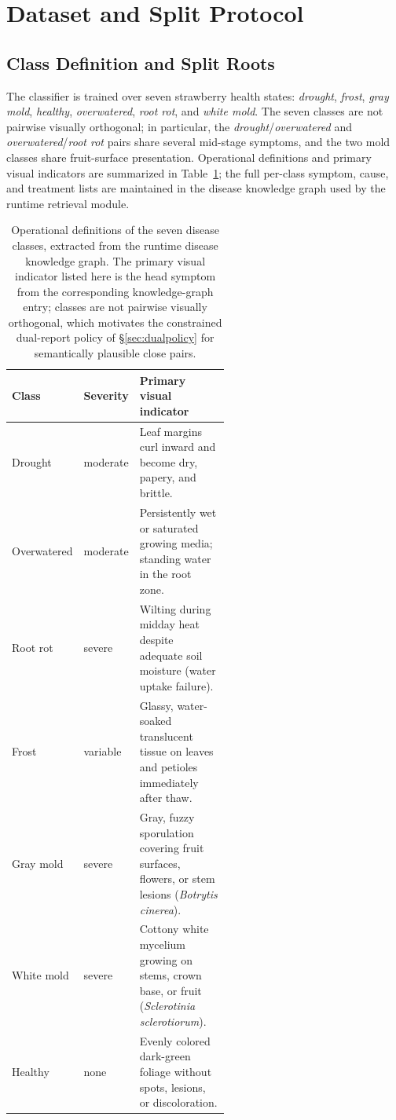 \section{Dataset and Split Protocol}
\label{sec:data}

\subsection{Class Definition and Split Roots}

The classifier is trained over seven strawberry health states:
\emph{drought}, \emph{frost}, \emph{gray mold}, \emph{healthy},
\emph{overwatered}, \emph{root rot}, and \emph{white mold}. The seven
classes are not pairwise visually orthogonal; in particular, the
\emph{drought}/\emph{overwatered} and \emph{overwatered}/\emph{root rot}
pairs share several mid-stage symptoms, and the two mold classes share
fruit-surface presentation. Operational definitions and primary
visual indicators are summarized in Table~\ref{tab:class-defs}; the
full per-class symptom, cause, and treatment lists are maintained in
the disease knowledge graph used by the runtime retrieval module.

\begin{table}[t]
\centering
\caption{Operational definitions of the seven disease classes,
extracted from the runtime disease knowledge graph. The primary visual
indicator listed here is the head symptom from the corresponding
knowledge-graph entry; classes are not pairwise visually orthogonal,
which motivates the constrained dual-report policy of
\S\ref{sec:dualpolicy} for semantically plausible close pairs.}
\label{tab:class-defs}
\begin{tabular}{l l p{0.55\linewidth}}
\toprule
Class & Severity & Primary visual indicator \\
\midrule
Drought & moderate & Leaf margins curl inward and become dry, papery, and brittle. \\
Overwatered & moderate & Persistently wet or saturated growing media; standing water in the root zone. \\
Root rot & severe & Wilting during midday heat despite adequate soil moisture (water uptake failure). \\
Frost & variable & Glassy, water-soaked translucent tissue on leaves and petioles immediately after thaw. \\
Gray mold & severe & Gray, fuzzy sporulation covering fruit surfaces, flowers, or stem lesions (\emph{Botrytis cinerea}). \\
White mold & severe & Cottony white mycelium growing on stems, crown base, or fruit (\emph{Sclerotinia sclerotiorum}). \\
Healthy & none & Evenly colored dark-green foliage without spots, lesions, or discoloration. \\
\bottomrule
\end{tabular}
\end{table}

